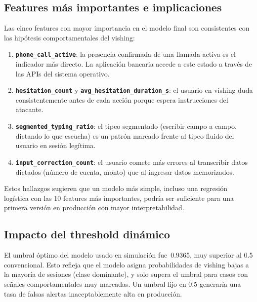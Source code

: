 \documentclass[journal]{IEEEtran}
\begin{document}
\subsection{Features más importantes e implicaciones}

Las cinco features con mayor importancia en el modelo final son consistentes
con las hipótesis comportamentales del vishing:

\begin{enumerate}
    \item \textbf{\texttt{phone\_call\_active}}: la presencia confirmada de
    una llamada activa es el indicador más directo. La aplicación bancaria
    accede a este estado a través de las APIs del sistema operativo.

    \item \textbf{\texttt{hesitation\_count}} y
    \textbf{\texttt{avg\_hesitation\_duration\_s}}: el usuario en vishing
    duda consistentemente antes de cada acción porque espera instrucciones
    del atacante.

    \item \textbf{\texttt{segmented\_typing\_ratio}}: el tipeo segmentado
    (escribir campo a campo, dictando lo que escucha) es un patrón marcado
    frente al tipeo fluido del usuario en sesión legítima.

    \item \textbf{\texttt{input\_correction\_count}}: el usuario comete más
    errores al transcribir datos dictados (número de cuenta, monto) que al
    ingresar datos memorizados.
\end{enumerate}

Estos hallazgos sugieren que un modelo más simple, incluso una regresión
logística con las 10 features más importantes, podría ser suficiente para
una primera versión en producción con mayor interpretabilidad.

\subsection{Impacto del threshold dinámico}

El umbral óptimo del modelo usado en simulación fue~0.9365, muy superior al
0.5 convencional. Esto refleja que el modelo asigna probabilidades de vishing
bajas a la mayoría de sesiones (clase dominante), y solo supera el umbral para
casos con señales comportamentales muy marcadas. Un umbral fijo en 0.5
generaría una tasa de falsas alertas inaceptablemente alta en producción.
\end{document}
